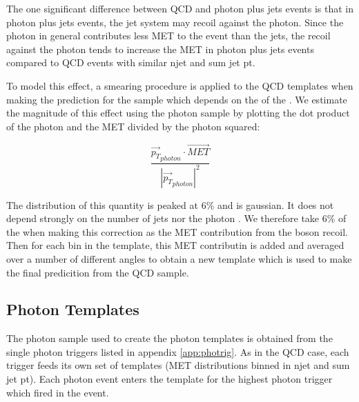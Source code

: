 The one significant difference between QCD and photon plus jets events is that in photon plus
jets events, the jet system may recoil against the photon. Since the photon in general 
contributes less MET to the event than the jets, the recoil against the photon tends to increase 
the MET in photon plus jets events compared to QCD events with similar njet and sum jet pt.

To model this effect, a smearing procedure is applied to the QCD templates when making the 
prediction for the \Z sample which depends on the \pt of the \Z. We estimate the magnitude 
of this effect using the photon sample by plotting the dot product of the photon \pt and the MET 
divided by the photon \pt squared:

\begin{equation}
\frac{\overrightarrow{p_T}_{photon} \cdot \overrightarrow{MET}}{|\overrightarrow{p_T}_{photon}|^2}
\end{equation}

%

The distribution of this quantity is peaked at 6\% and is gaussian. It does not depend strongly on 
the number of jets nor the photon \pt. We therefore take 6\% of the \Z \pt when making this 
correction as the MET contribution from the boson recoil. Then for each bin in the template, this 
MET contributin is added and averaged over a number of different angles to obtain a new template 
which is used to make the final predicition from the QCD sample.


\subsection{Photon Templates}
\label{sec:templatespho}

The photon sample used to create the photon templates is obtained from the single photon triggers 
listed in appendix \ref{app:photrig}. As in the QCD case, each trigger feeds its own set of templates 
(MET distributions binned in njet and sum jet pt).
Each photon event enters the template for the
highest \pt photon trigger which fired in the event. 

